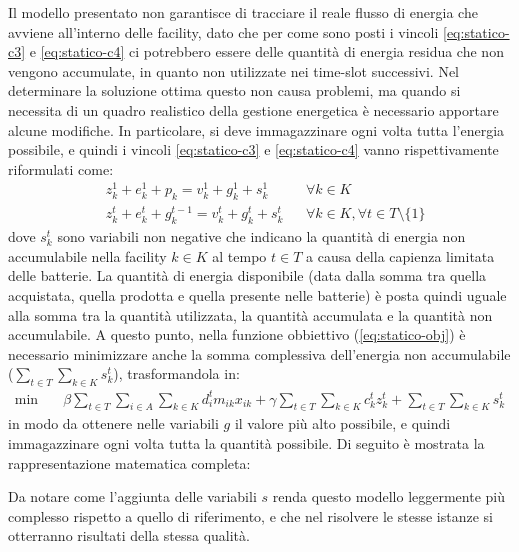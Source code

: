 Il modello presentato non garantisce di tracciare il reale flusso di energia che avviene all'interno delle facility, dato che per come sono posti i vincoli \ref{eq:statico-c3} e \ref{eq:statico-c4} ci potrebbero essere delle quantità di energia residua che non vengono accumulate, in quanto non utilizzate nei time-slot successivi. Nel determinare la soluzione ottima questo non causa problemi, ma quando si necessita di un quadro realistico della gestione energetica è necessario apportare alcune modifiche. In particolare, si deve immagazzinare ogni volta tutta l'energia possibile, e quindi i vincoli \ref{eq:statico-c3} e \ref{eq:statico-c4} vanno rispettivamente riformulati come:
\begin{align}
    \label{eq:statico-c3var}
    & z_k^1 + e_k^1 + p_k = v_k^1 + g_k^1 + s_k^1       &   & \forall k \in K                                  \\
    \label{eq:statico-c4var}
    & z_k^t + e_k^t + g_k^{t-1} = v_k^t + g_k^t + s_k^t &   & \forall k \in K, \forall t \in T \setminus \{1\}
\end{align}
\noindent
dove $s^t_k$ sono variabili non negative che indicano la quantità di energia non accumulabile nella facility $k \in K$ al tempo $t \in T$ a causa della capienza limitata delle batterie. La quantità di energia disponibile (data dalla somma tra quella acquistata, quella prodotta e quella presente nelle batterie) è posta quindi uguale alla somma tra la quantità utilizzata, la quantità accumulata e la quantità non accumulabile. A questo punto, nella funzione obbiettivo (\ref{eq:statico-obj}) è necessario minimizzare anche la somma complessiva dell'energia non accumulabile ($\sum_{t \in T}\sum_{k \in K} s^t_k$), trasformandola in:
\begin{align}
    \label{eq:statico-objvar}
    \min\quad       & \beta \sum_{t \in T} \sum_{i \in A} \sum_{k \in K}{d^t_i m_{ik} x_{ik}} + \gamma \sum_{t \in T} \sum_{k \in K}{c_k^t z_k^t} + \sum_{t \in T} \sum_{k \in K}{s_k^t}
\end{align}
\noindent
in modo da ottenere nelle variabili $g$ il valore più alto possibile, e quindi immagazzinare ogni volta tutta la quantità possibile. Di seguito è mostrata la rappresentazione matematica completa:


Da notare come l'aggiunta delle variabili $s$ renda questo modello leggermente più complesso rispetto a quello di riferimento, e che nel risolvere le stesse istanze si otterranno risultati della stessa qualità.


